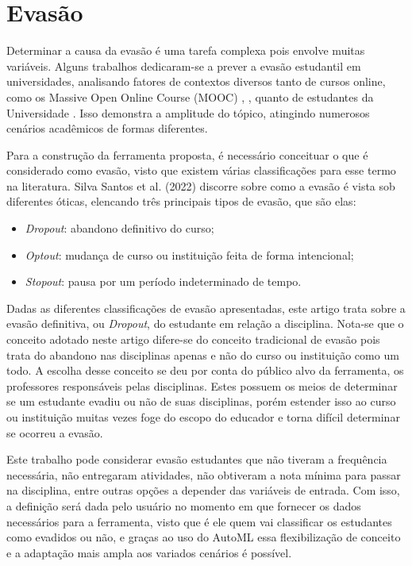 \documentclass[12pt]{article}
\begin{document}
\section{Evasão} \label{sec:evasao}

Determinar a causa da evasão é uma tarefa complexa pois envolve muitas variáveis. Alguns trabalhos  dedicaram-se a prever a evasão estudantil em universidades, analisando fatores de contextos diversos tanto de cursos online, como os Massive Open Online Course (MOOC) \cite{Liang}, \cite{Periwal}, quanto de estudantes da Universidade \cite{Costa}. Isso demonstra a amplitude do tópico, atingindo numerosos cenários acadêmicos de formas diferentes.\textcolor{white}{\cite{maria:2022}}

Para a construção da ferramenta proposta, é necessário conceituar o que é considerado como evasão, visto que existem várias classificações para esse termo na literatura. Silva Santos et al. (2022) discorre sobre como a evasão é vista sob diferentes óticas, elencando três principais tipos de evasão, que são elas:
\begin{itemize}
    \item \textit{Dropout}: abandono definitivo do curso;
    \item \textit{Optout}: mudança de curso ou instituição feita de forma intencional;
    \item \textit{Stopout}: pausa por um período indeterminado de tempo.
\end{itemize}

Dadas as diferentes classificações de evasão apresentadas, este artigo trata sobre a evasão definitiva, ou \textit{Dropout}, do estudante em relação a disciplina. Nota-se que o conceito adotado neste artigo difere-se do conceito tradicional de evasão pois trata do abandono nas disciplinas apenas e não do curso ou instituição como um todo. A escolha desse conceito se deu por conta do público alvo da ferramenta, os professores responsáveis pelas disciplinas. Estes possuem os meios de determinar se um estudante evadiu ou não de suas disciplinas, porém estender isso ao curso ou instituição muitas vezes foge do escopo do educador e torna difícil determinar se ocorreu a evasão.

Este trabalho pode considerar evasão estudantes que não tiveram a frequência necessária, não entregaram atividades, não obtiveram a nota mínima para passar na disciplina, entre outras opções a depender das variáveis de entrada. Com isso, a definição será dada pelo usuário no momento em que fornecer os dados necessários para a ferramenta, visto que é ele quem vai classificar os estudantes como evadidos ou não, e graças ao uso do AutoML essa flexibilização de conceito e a adaptação mais ampla aos variados cenários é possível.
\end{document}
